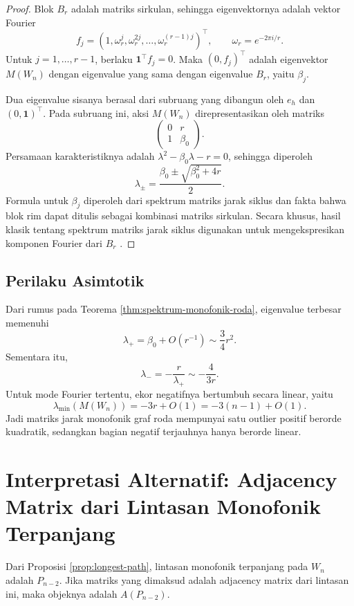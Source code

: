 \documentclass[12pt,a4paper]{article}
\theoremstyle{definition}
\newcommand{\one}{\mathbf{1}}
\begin{document}
\begin{proof}
  Blok $B_r$ adalah matriks sirkulan, sehingga eigenvektornya adalah vektor Fourier
  \[
    f_j=(1,\omega_r^j,\omega_r^{2j},\ldots,\omega_r^{(r-1)j})^\top,\qquad
    \omega_r=e^{-2\pi i/r}.
  \]
  Untuk $j=1,\ldots,r-1$, berlaku $\one^\top f_j=0$. Maka $(0,f_j)^\top$ adalah eigenvektor $M(W_n)$ dengan eigenvalue yang sama dengan eigenvalue $B_r$, yaitu $\beta_j$.

  Dua eigenvalue sisanya berasal dari subruang yang dibangun oleh $e_h$ dan $(0,\one)^\top$. Pada subruang ini, aksi $M(W_n)$ direpresentasikan oleh matriks
  \[
    \begin{pmatrix}
      0 & r       \\
      1 & \beta_0
    \end{pmatrix}.
  \]
  Persamaan karakteristiknya adalah $\lambda^2-\beta_0\lambda-r=0$, sehingga diperoleh
  \[
    \lambda_\pm=\frac{\beta_0\pm\sqrt{\beta_0^2+4r}}{2}.
  \]
  Formula untuk $\beta_j$ diperoleh dari spektrum matriks jarak siklus dan fakta bahwa blok rim dapat ditulis sebagai kombinasi matriks sirkulan. Secara khusus, hasil klasik tentang spektrum matriks jarak siklus digunakan untuk mengekspresikan komponen Fourier dari $B_r$ \citep{graovac1985distance,stevanovic2012distance}.
\end{proof}

\subsection{Perilaku Asimtotik}

Dari rumus pada Teorema \ref{thm:spektrum-monofonik-roda}, eigenvalue terbesar memenuhi
\[
  \lambda_+=\beta_0+O(r^{-1})\sim \frac34r^2.
\]
Sementara itu,
\[
  \lambda_-=-\frac{r}{\lambda_+}\sim -\frac{4}{3r}.
\]
Untuk mode Fourier tertentu, ekor negatifnya bertumbuh secara linear, yaitu
\[
  \lambda_{\min}(M(W_n))=-3r+O(1)=-3(n-1)+O(1).
\]
Jadi matriks jarak monofonik graf roda mempunyai satu outlier positif berorde kuadratik, sedangkan bagian negatif terjauhnya hanya berorde linear.

\section{Interpretasi Alternatif: Adjacency Matrix dari Lintasan Monofonik Terpanjang}

Dari Proposisi \ref{prop:longest-path}, lintasan monofonik terpanjang pada $W_n$ adalah $P_{n-2}$. Jika matriks yang dimaksud adalah adjacency matrix dari lintasan ini, maka objeknya adalah $A(P_{n-2})$.
\end{document}
